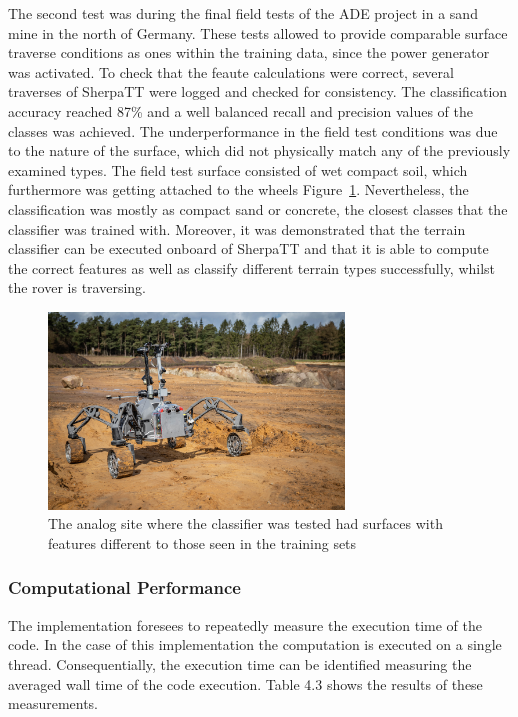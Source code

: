 \documentclass{article}
\begin{document}
The second test was during the final field tests of the ADE project \cite{ocon2021} in a sand mine in the north of Germany.
These tests allowed to provide comparable surface traverse conditions as ones within the training data, since the power generator was activated.
To check that the feaute calculations were correct, several traverses of SherpaTT were logged and checked for consistency. 
The classification accuracy reached 87\% and a well balanced recall and precision values of the classes was achieved. 
The underperformance in the field test conditions was due to the nature of the surface, which did not physically match any of the previously examined types. 
The field test surface consisted of wet compact soil, which furthermore was getting attached to the wheels Figure~\ref{fig:finaltest}.
Nevertheless, the classification was mostly as compact sand or concrete, the closest classes that the classifier was trained with.
Moreover, it was demonstrated that the terrain classifier can be executed onboard of SherpaTT and that it is able to compute the correct features as well as classify different terrain types successfully, whilst the rover is traversing.


\begin{figure}[!htb]
 \centering
 \includegraphics[width=0.7\textwidth]{../figures/sandmine.png}
 \caption{The analog site where the classifier was tested had surfaces with features different to those seen in the training sets}
 \label{fig:finaltest}
\end{figure}


\subsubsection{Computational Performance}


The implementation foresees to repeatedly measure the execution time of the code. In the case of this implementation the computation is executed on a single thread. Consequentially, the execution time can be identified measuring the averaged wall time of the code execution. Table 4.3 shows the results of these measurements. 
\end{document}
